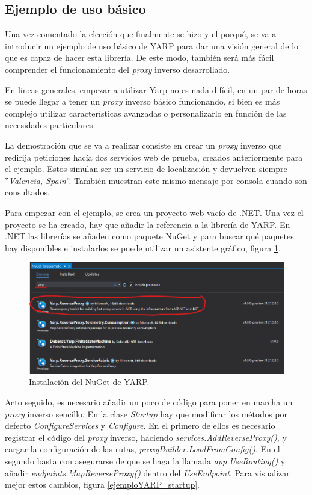\documentclass[11pt,spanish,listoffigures]{tfgetsinf}
\begin{document}
		\subsection{Ejemplo de uso básico}

Una vez comentado la elección que finalmente se hizo y el porqué, se va a introducir un ejemplo de uso básico de YARP para dar una visión general de lo que es capaz de hacer esta librería. De este modo, también será más fácil comprender el funcionamiento del \emph{proxy} inverso desarrollado.

En lineas generales, empezar a utilizar Yarp no es nada difícil, en un par de horas se puede llegar a tener un \emph{proxy} inverso básico funcionando, si bien es más complejo utilizar características avanzadas o personalizarlo en función de las necesidades particulares.

La demostración que se va a realizar consiste en crear un \emph{proxy} inverso que redirija peticiones hacía dos servicios web de prueba, creados anteriormente para el ejemplo. Estos simulan ser un servicio de localización y devuelven siempre ''\emph{Valencia, Spain}''. También muestran este mismo mensaje por consola cuando son consultados.

Para empezar con el ejemplo, se crea un proyecto web vacío de .NET. Una vez el proyecto se ha creado, hay que añadir la referencia a la librería de YARP. En .NET las librerías se añaden como paquete NuGet \cite{NuGet} y para buscar qué paquetes hay disponibles e instalarlos se puede utilizar un asistente gráfico, figura \ref{ejemploYARP_instalacionNuGet}.

\begin{figure}[ht]
\centering
\includegraphics[width=1\textwidth]{imagenes/ejemploYARP/instalacionNuGet}
\caption{Instalación del NuGet de YARP.}
	\label{ejemploYARP_instalacionNuGet}
\end{figure}

Acto seguido, es necesario añadir un poco de código para poner en marcha un \emph{proxy} inverso sencillo. En la clase \emph{Startup} hay que modificar los métodos por defecto \emph{ConfigureServices} y \emph{Configure}. En el primero de ellos es necesario registrar el código del \emph{proxy} inverso, haciendo \emph{services.AddReverseProxy()}, y cargar la configuración de las rutas, \emph{proxyBuilder.LoadFromConfig()}. En el segundo basta con asegurarse de que se haga la llamada \emph{app.UseRouting()} y añadir  \emph{endpoints.MapReverseProxy()} dentro del \emph{UseEndpoint}. Para visualizar mejor estos cambios, figura \ref{ejemploYARP_startup}.
\end{document}
